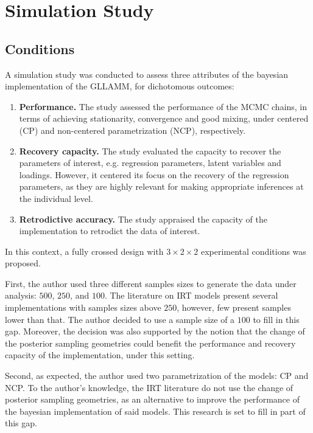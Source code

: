 \chapter{Simulation Study} \label{chap:simulation}

\section{Conditions}

A simulation study was conducted to assess three attributes of the bayesian implementation of the GLLAMM, for dichotomous outcomes:
%
\begin{enumerate}
	\item \textbf{Performance.} The study assessed the performance of the MCMC chains, in terms of achieving stationarity, convergence and good mixing,  under centered (CP) and non-centered parametrization (NCP), respectively.
	\item \textbf{Recovery capacity.} The study evaluated the capacity to recover the parameters of interest, e.g. regression parameters, latent variables and loadings. However, it centered its focus on the recovery of the regression parameters, as they are highly relevant for making appropriate inferences at the individual level.
	\item \textbf{Retrodictive accuracy.} The study appraised the capacity of the implementation to retrodict the data of interest.
\end{enumerate} 

\noindent In this context, a fully crossed design with $3 \times 2 \times 2$ experimental conditions was proposed. 

First, the author used three different samples sizes to generate the data under analysis: $500$, $250$, and $100$. The literature on IRT models present several implementations with samples sizes above $250$, however, few present samples lower than that. The author decided to use a sample size of a $100$ to fill in this gap. Moreover, the decision was also supported by the notion that the change of the posterior sampling geometries could benefit the performance and recovery capacity of the implementation, under this setting.

Second, as expected, the author used two parametrization of the models: CP and NCP. To the author's knowledge, the IRT literature do not use the change of posterior sampling geometries, as an alternative to improve the performance of the bayesian implementation of said models. This research is set to fill in part of this gap.

